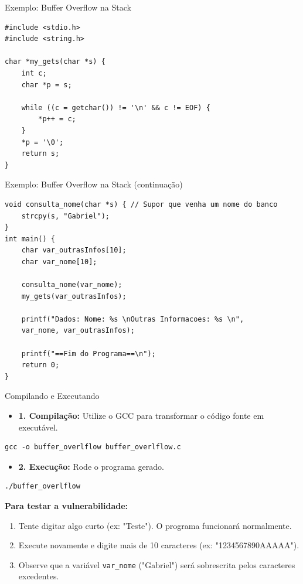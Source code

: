 \begin{frame}[fragile]{Exemplo: Buffer Overflow na Stack}

    \begin{verbatim}
#include <stdio.h>
#include <string.h>

char *my_gets(char *s) {
    int c;
    char *p = s;

    while ((c = getchar()) != '\n' && c != EOF) {
        *p++ = c;
    }
    *p = '\0';
    return s;
}
\end{verbatim}
\end{frame}

\begin{frame}[fragile]{Exemplo: Buffer Overflow na Stack (continuação)}

    \begin{verbatim}
void consulta_nome(char *s) { // Supor que venha um nome do banco
    strcpy(s, "Gabriel");
}
int main() {
    char var_outrasInfos[10];
    char var_nome[10];

    consulta_nome(var_nome);
    my_gets(var_outrasInfos);   

    printf("Dados: Nome: %s \nOutras Informacoes: %s \n", 
    var_nome, var_outrasInfos);

    printf("==Fim do Programa==\n");
    return 0;
}
\end{verbatim}
\end{frame}

\begin{frame}[fragile]{Compilando e Executando}
    \begin{itemize}
        \item \textbf{1. Compilação:}
              Utilize o GCC para transformar o código fonte em executável.
    \end{itemize}

    \begin{verbatim}
gcc -o buffer_overlflow buffer_overlflow.c
    \end{verbatim}



    \begin{itemize}
        \item \textbf{2. Execução:}
              Rode o programa gerado.
    \end{itemize}

    \begin{verbatim}
./buffer_overlflow
    \end{verbatim}



    \textbf{Para testar a vulnerabilidade:}
    \begin{enumerate}
        \item Tente digitar algo curto (ex: "Teste"). O programa funcionará normalmente.
        \item Execute novamente e digite mais de 10 caracteres (ex: "1234567890AAAAA").
        \item Observe que a variável \texttt{var\_nome} ("Gabriel") será sobrescrita pelos caracteres excedentes.
    \end{enumerate}
\end{frame}

